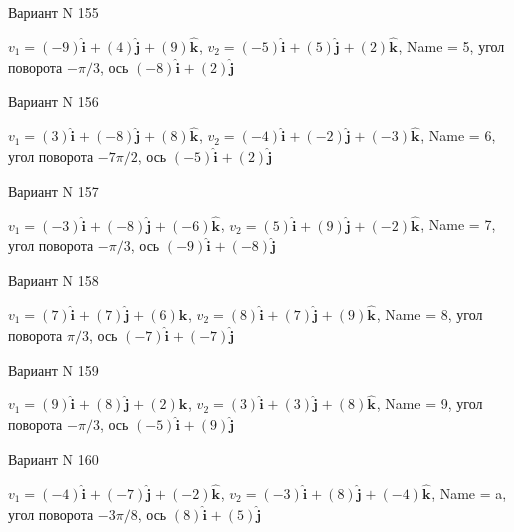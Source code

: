 \documentclass[11pt]{report}
\begin{document}
Вариант N 155

$v_1 = \left(-9\right)\mathbf{\hat{i}_{}} + \left(4\right)\mathbf{\hat{j}_{}} + \left(9\right)\mathbf{\hat{k}_{}}$, $v_2 = \left(-5\right)\mathbf{\hat{i}_{}} + \left(5\right)\mathbf{\hat{j}_{}} + \left(2\right)\mathbf{\hat{k}_{}}$, Name = 5, угол поворота $- \pi / 3$, ось $\left(-8\right)\mathbf{\hat{i}_{}} + \left(2\right)\mathbf{\hat{j}_{}}$

Вариант N 156

$v_1 = \left(3\right)\mathbf{\hat{i}_{}} + \left(-8\right)\mathbf{\hat{j}_{}} + \left(8\right)\mathbf{\hat{k}_{}}$, $v_2 = \left(-4\right)\mathbf{\hat{i}_{}} + \left(-2\right)\mathbf{\hat{j}_{}} + \left(-3\right)\mathbf{\hat{k}_{}}$, Name = 6, угол поворота $- 7 \pi / 2$, ось $\left(-5\right)\mathbf{\hat{i}_{}} + \left(2\right)\mathbf{\hat{j}_{}}$

Вариант N 157

$v_1 = \left(-3\right)\mathbf{\hat{i}_{}} + \left(-8\right)\mathbf{\hat{j}_{}} + \left(-6\right)\mathbf{\hat{k}_{}}$, $v_2 = \left(5\right)\mathbf{\hat{i}_{}} + \left(9\right)\mathbf{\hat{j}_{}} + \left(-2\right)\mathbf{\hat{k}_{}}$, Name = 7, угол поворота $- \pi / 3$, ось $\left(-9\right)\mathbf{\hat{i}_{}} + \left(-8\right)\mathbf{\hat{j}_{}}$

Вариант N 158

$v_1 = \left(7\right)\mathbf{\hat{i}_{}} + \left(7\right)\mathbf{\hat{j}_{}} + \left(6\right)\mathbf{\hat{k}_{}}$, $v_2 = \left(8\right)\mathbf{\hat{i}_{}} + \left(7\right)\mathbf{\hat{j}_{}} + \left(9\right)\mathbf{\hat{k}_{}}$, Name = 8, угол поворота $\pi / 3$, ось $\left(-7\right)\mathbf{\hat{i}_{}} + \left(-7\right)\mathbf{\hat{j}_{}}$

Вариант N 159

$v_1 = \left(9\right)\mathbf{\hat{i}_{}} + \left(8\right)\mathbf{\hat{j}_{}} + \left(2\right)\mathbf{\hat{k}_{}}$, $v_2 = \left(3\right)\mathbf{\hat{i}_{}} + \left(3\right)\mathbf{\hat{j}_{}} + \left(8\right)\mathbf{\hat{k}_{}}$, Name = 9, угол поворота $- \pi / 3$, ось $\left(-5\right)\mathbf{\hat{i}_{}} + \left(9\right)\mathbf{\hat{j}_{}}$

Вариант N 160

$v_1 = \left(-4\right)\mathbf{\hat{i}_{}} + \left(-7\right)\mathbf{\hat{j}_{}} + \left(-2\right)\mathbf{\hat{k}_{}}$, $v_2 = \left(-3\right)\mathbf{\hat{i}_{}} + \left(8\right)\mathbf{\hat{j}_{}} + \left(-4\right)\mathbf{\hat{k}_{}}$, Name = a, угол поворота $- 3 \pi / 8$, ось $\left(8\right)\mathbf{\hat{i}_{}} + \left(5\right)\mathbf{\hat{j}_{}}$
\end{document}

